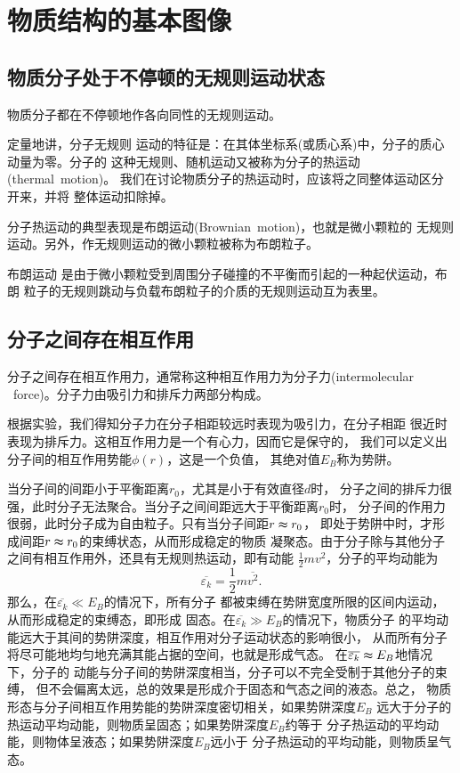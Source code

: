 \section{物质结构的基本图像}
\subsection{物质分子处于不停顿的无规则运动状态}
\begin{theorem}
    物质分子都在不停顿地作各向同性的无规则运动。
\end{theorem}

定量地讲，分子无规则
运动的特征是：在其体坐标系(或质心系)中，分子的质心动量为零。分子的 
这种无规则、随机运动又被称为分子的热运动(thermal~motion)。
我们在讨论物质分子的热运动时，应该将之同整体运动区分开来，并将
整体运动扣除掉。

分子热运动的典型表现是布朗运动(Brownian~motion)，也就是微小颗粒的
无规则运动。另外，作无规则运动的微小颗粒被称为布朗粒子。\begin{theorem}
    布朗运动
    是由于微小颗粒受到周围分子碰撞的不平衡而引起的一种起伏运动，布朗 
    粒子的无规则跳动与负载布朗粒子的介质的无规则运动互为表里。
\end{theorem}

\subsection{分子之间存在相互作用}
\begin{theorem}
    分子之间存在相互作用力，通常称这种相互作用力为分子力(intermolecular
    ~force)。分子力由吸引力和排斥力两部分构成。
\end{theorem}

根据实验，我们得知分子力在分子相距较远时表现为吸引力，在分子相距
很近时表现为排斥力。这相互作用力是一个有心力，因而它是保守的，
我们可以定义出分子间的相互作用势能$\phi(r)$，这是一个负值，
其绝对值$E_B$称为势阱。

当分子间的间距小于平衡距离$r_0$，尤其是小于有效直径$d$时，
分子之间的排斥力很强，此时分子无法聚合。当分子之间间距远大于平衡距离$r_0$时，
分子间的作用力很弱，此时分子成为自由粒子。只有当分子间距$r\thickapprox r_0$，
即处于势阱中时，才形成间距$r\thickapprox r_0$的束缚状态，从而形成稳定的物质
凝聚态。由于分子除与其他分子之间有相互作用外，还具有无规则热运动，即有动能
$\frac{1}{2}mv^2$，分子的平均动能为
\begin{equation}
    \overline{\varepsilon_k}=\frac{1}{2}m\overline{v^2}.
\end{equation}
那么，在$\overline{\varepsilon_k}\ll  E_B$的情况下，所有分子
都被束缚在势阱宽度所限的区间内运动，从而形成稳定的束缚态，即形成
固态。在$\overline{\varepsilon_k}\gg  E_B$的情况下，物质分子 
的平均动能远大于其间的势阱深度，相互作用对分子运动状态的影响很小，
从而所有分子将尽可能地均匀地充满其能占据的空间，也就是形成气态。
在$\overline{\varepsilon_k}\thickapprox  E_B$地情况下，分子的
动能与分子间的势阱深度相当，分子可以不完全受制于其他分子的束缚，
但不会偏离太远，总的效果是形成介于固态和气态之间的液态。总之，
物质形态与分子间相互作用势能的势阱深度密切相关，如果势阱深度$E_B$
远大于分子的热运动平均动能，则物质呈固态；如果势阱深度$E_B$约等于
分子热运动的平均动能，则物体呈液态；如果势阱深度$E_B$远小于
分子热运动的平均动能，则物质呈气态。
